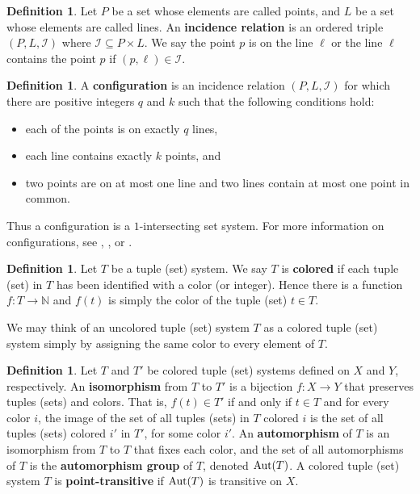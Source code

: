 \documentclass{amsart}
\theoremstyle{definition}
\newtheorem{definition}[thrm]{Definition}
\theoremstyle{remark}
\numberwithin{equation}{section}
\def\Aut{{\rm Aut}}
\def\cal{\mathcal}
\begin{document}
\begin{definition}
Let $P$ be a set whose elements are called points, and $L$ be a set whose elements are called lines.  An {\bf incidence relation} is an ordered triple $(P,L,{\cal I})$ where ${\cal I}\subseteq P\times L$.  We say the point $p$ is on the line $\ell$ or the line $\ell$ contains the point $p$ if $(p,\ell)\in {\cal I}$.
\end{definition}

\begin{definition}
A {\bf configuration} is an incidence relation $(P,L,{\cal I})$ for which there are positive integers $q$ and $k$ such that the following conditions hold:
\begin{itemize}
\item each of the points is on exactly $q$ lines,
\item each line contains exactly $k$ points, and
\item two points are on at most one line and two lines contain at most one point in common.
\end{itemize}
\end{definition}

Thus a configuration is a $1$-intersecting set system.  For more information on configurations, see \cite{Grunbaum2009}, \cite{PisanskiS2013}, or \cite[Section 6.4]{Book}.

\begin{definition}
Let $T$ be a tuple (set) system.  We say $T$ is {\bf colored} if each tuple (set) in $T$ has been identified with a color (or integer).  Hence there is a function $f:T\to {\mathbb N}$ and $f(t)$ is simply the color of the tuple (set) $t\in T$.
\end{definition}

We may think of an uncolored tuple (set) system $T$ as a colored tuple (set) system simply by assigning the same color to every element of $T$.

\begin{definition}
Let $T$ and $T'$ be colored tuple (set) systems defined on $X$ and $Y$, respectively.  An {\bf isomorphism} from $T$ to $T'$ is a bijection $f:X\to Y$ that preserves tuples (sets) and colors.  That is, $f(t)\in T'$ if and only if $t\in T$ and for every color $i$, the image of the set of all tuples (sets) in $T$ colored $i$ is the set of all tuples (sets) colored $i'$ in $T'$, for some color $i'$.  An {\bf automorphism} of $T$ is an isomorphism from $T$ to $T$ that fixes each color, and the set of all automorphisms of $T$ is the {\bf automorphism group} of $T$, denoted $\Aut(T)$.  A colored tuple (set) system $T$ is {\bf point-transitive} if $\Aut(T)$ is transitive on $X$.
\end{definition}
\end{document}
